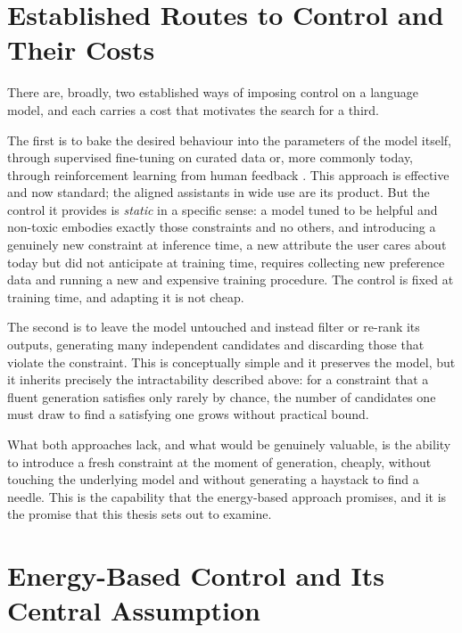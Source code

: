 \section{Established Routes to Control and Their Costs}
\label{sec:intro-routes}

There are, broadly, two established ways of imposing control on a language model, and each carries a cost that motivates the search for a third.

The first is to bake the desired behaviour into the parameters of the model itself, through supervised fine-tuning on curated data or, more commonly today, through reinforcement learning from human feedback \citep{ouyang2022training}. This approach is effective and now standard; the aligned assistants in wide use are its product. But the control it provides is \emph{static} in a specific sense: a model tuned to be helpful and non-toxic embodies exactly those constraints and no others, and introducing a genuinely new constraint at inference time, a new attribute the user cares about today but did not anticipate at training time, requires collecting new preference data and running a new and expensive training procedure. The control is fixed at training time, and adapting it is not cheap.

The second is to leave the model untouched and instead filter or re-rank its outputs, generating many independent candidates and discarding those that violate the constraint. This is conceptually simple and it preserves the model, but it inherits precisely the intractability described above: for a constraint that a fluent generation satisfies only rarely by chance, the number of candidates one must draw to find a satisfying one grows without practical bound.

What both approaches lack, and what would be genuinely valuable, is the ability to introduce a fresh constraint at the moment of generation, cheaply, without touching the underlying model and without generating a haystack to find a needle. This is the capability that the energy-based approach promises, and it is the promise that this thesis sets out to examine.

\section{Energy-Based Control and Its Central Assumption}
\label{sec:intro-ebm}

